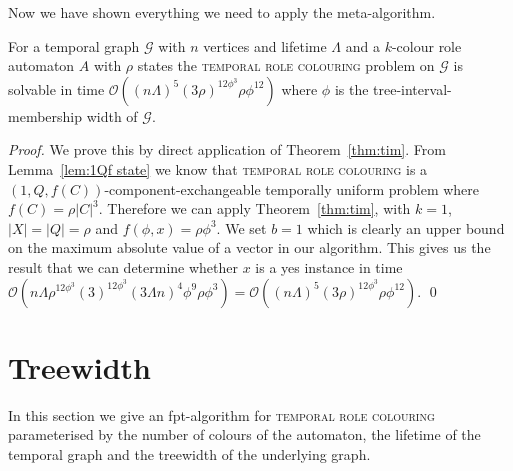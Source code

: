 \documentclass[runningheads]{llncs}
\begin{document}
Now we have shown everything we need to apply the meta-algorithm. 
\begin{theorem}
    For a temporal graph $\mathcal{G}$ with $n$ vertices and lifetime $\Lambda$ and a $k$-colour role automaton $A$ with $\rho$ states the \textsc{temporal role colouring} problem on $\mathcal{G}$ is solvable in time $\mathcal{O}((n\Lambda)^5(3\rho)^{12\phi^3}\rho\phi^{12})$ where $\phi$ is the tree-interval-membership width of $\mathcal{G}$.
\end{theorem}
\begin{proof}
    We prove this by direct application of Theorem~\ref{thm:tim}.
    From Lemma~\ref{lem:1Qf state} we know that \textsc{temporal role colouring} is a $(1,Q,f(C))$-component-exchangeable temporally uniform problem where $f(C)=\rho|C|^3$. Therefore we can apply Theorem~\ref{thm:tim}, with $k=1$, $|X|=|Q|=\rho$ and $f(\phi,x)=\rho\phi^3$. We set $b=1$ which is clearly an upper bound on the maximum absolute value of a vector in our algorithm. This
    gives us the result that we can determine whether $x$ is a yes instance in time $\mathcal{O}(n \Lambda \rho^{12\phi^3} (3)^{12\phi^3}(3\Lambda n)^4\phi^9\rho \phi^3)=\mathcal{O}((n\Lambda)^5(3\rho)^{12\phi^3}\rho\phi^{12})$.
\qed \end{proof}

\section{Treewidth}
In this section we give an fpt-algorithm for \textsc{temporal role colouring} parameterised by the number of colours of the automaton, the lifetime of the temporal graph and the treewidth of the underlying graph.
\end{document}
